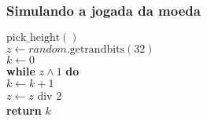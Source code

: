 \documentclass{beamer}
\begin{document}
\begin{frame}
\frametitle{Simulando a jogada da moeda}
\begin{oframed}
\begin{flushleft}
\hspace*{1em} \ensuremath{\mathrm{pick\_height}()}\\
\hspace*{1em} \hspace*{1em} \ensuremath{\ensuremath{\mathit{z}} \gets  \ensuremath{\ensuremath{\mathit{random}}.\mathrm{getrandbits}(32)}}\\
\hspace*{1em} \hspace*{1em} \ensuremath{\ensuremath{\mathit{k}} \gets  \ensuremath{0}}\\
\hspace*{1em} \hspace*{1em} {\color{black} \textbf{while}} \ensuremath{\ensuremath{\mathit{z}}  \wedge  1} {\color{black} \textbf{do}} \\
\hspace*{1em} \hspace*{1em} \hspace*{1em} \ensuremath{\ensuremath{\mathit{k}} \gets  \ensuremath{\ensuremath{\mathit{k}} + 1}}\\
\hspace*{1em} \hspace*{1em} \hspace*{1em} \ensuremath{\ensuremath{\mathit{z}} \gets  \ensuremath{\ensuremath{\mathit{z}}}} div  $2$\\
\hspace*{1em} \hspace*{1em} {\color{black} \textbf{return}} \ensuremath{\ensuremath{\mathit{k}}}\\
\end{flushleft}
\end{oframed}
\end{frame}
\end{document}
